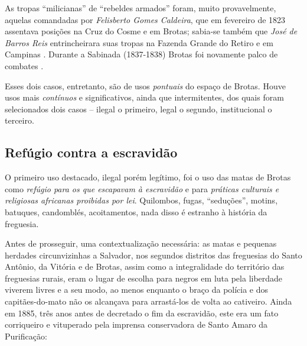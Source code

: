 As tropas ``milicianas'' de ``rebeldes armados'' foram, muito provavelmente, aquelas comandadas por \textit{Felisberto Gomes Caldeira}, que em fevereiro de 1823 assentava posições na Cruz do Cosme e em Brotas; sabia-se também que \textit{José de Barros Reis} entrincheirara suas tropas na Fazenda Grande do Retiro e em Campinas \cite[p.~248]{ruy_camara_1953}. Durante a Sabinada (1837-1838) Brotas foi novamente palco de combates \cite[p.~536]{ruy_politica_1949}.

Esses dois casos, entretanto, são de usos \textit{pontuais} do espaço de Brotas. Houve usos mais \textit{contínuos} e significativos, ainda que intermitentes, dos quais foram selecionados dois casos -- ilegal o primeiro, legal o segundo, institucional o terceiro.

\subsection{Refúgio contra a escravidão}\label{subsec:refugioescrav}

O primeiro uso destacado, ilegal porém legítimo, foi o uso das matas de Brotas como \textit{refúgio para os que escapavam à escravidão} e para \textit{práticas culturais e religiosas africanas proibidas por lei}. Quilombos, fugas, ``seduções'', motins, batuques, candomblés, acoitamentos, nada disso é estranho à história da freguesia.

Antes de prosseguir, uma contextualização necessária: as matas e pequenas herdades circunvizinhas a Salvador, nos segundos distritos das freguesias do Santo Antônio, da Vitória e de Brotas, assim como a integralidade do território das freguesias rurais, eram o lugar de escolha para negros em luta pela liberdade viverem livres e a seu modo, ao menos enquanto o braço da polícia e dos capitães-do-mato não os alcançava para arrastá-los de volta ao cativeiro. Ainda em 1885, três anos antes de decretado o fim da escravidão, este era um fato corriqueiro e vituperado pela imprensa conservadora de Santo Amaro da Purificação:


